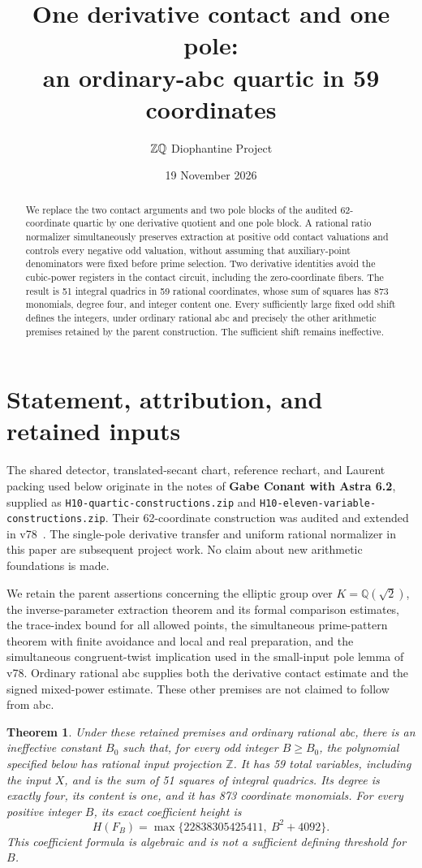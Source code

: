 \documentclass[11pt,a4paper]{article}
\title{One derivative contact and one pole:\\an ordinary-abc quartic in 59 coordinates}
\author{\(\Z\Q\) Diophantine Project}
\date{19 November 2026}
\newtheorem{theorem}{Theorem}[section]
\newcommand{\Q}{\mathbb Q}\newcommand{\Z}{\mathbb Z}
\begin{document}
\maketitle
\begin{abstract}
We replace the two contact arguments and two pole blocks of the audited
62-coordinate quartic by one derivative quotient and one pole block.
A rational ratio normalizer simultaneously preserves extraction at
positive odd contact valuations and controls every negative odd valuation,
without assuming that auxiliary-point denominators were fixed before prime
selection. Two derivative identities avoid the cubic-power registers in
the contact circuit, including the zero-coordinate fibers. The result is
51 integral quadrics in 59 rational coordinates, whose sum of squares has
873 monomials, degree four, and integer content one. Every sufficiently
large fixed odd shift defines the integers, under ordinary rational abc
and precisely the other arithmetic premises retained by the parent
construction. The sufficient shift remains ineffective.
\end{abstract}

\section{Statement, attribution, and retained inputs}

The shared detector, translated-secant chart, reference rechart, and
Laurent packing used below originate in the notes of \textbf{Gabe Conant
with Astra 6.2}, supplied as \texttt{H10-quartic-constructions.zip} and
\texttt{H10-eleven-variable-constructions.zip}. Their 62-coordinate
construction was audited and extended in v78~\cite{Conant,v78}.
The single-pole derivative transfer and uniform rational normalizer in
this paper are subsequent project work. No claim about new arithmetic
foundations is made.

We retain the parent assertions concerning the elliptic group over
$K=\Q(\sqrt2)$, the inverse-parameter extraction theorem and its formal
comparison estimates, the trace-index bound for all allowed points, the
simultaneous prime-pattern theorem with finite avoidance and local and
real preparation, and the simultaneous congruent-twist implication used
in the small-input pole lemma of v78. Ordinary rational abc supplies both
the derivative contact estimate and the signed mixed-power estimate.
These other premises are not claimed to follow from abc.

\begin{theorem}\label{thm:main}
Under these retained premises and ordinary rational abc, there is an
ineffective constant $B_0$ such that, for every odd integer $B\ge B_0$,
the polynomial specified below has rational input projection $\Z$.
It has 59 total variables, including the input $X$, and is the sum of
51 squares of integral quadrics. Its degree is exactly four, its content
is one, and it has 873 coordinate monomials. For every positive integer
$B$, its exact coefficient height is
\[
 H(F_B)=\max\{22838305425411,\ B^2+4092\}.
\]
This coefficient formula is algebraic and is not a sufficient defining
threshold for $B$.
\end{theorem}
\end{document}
